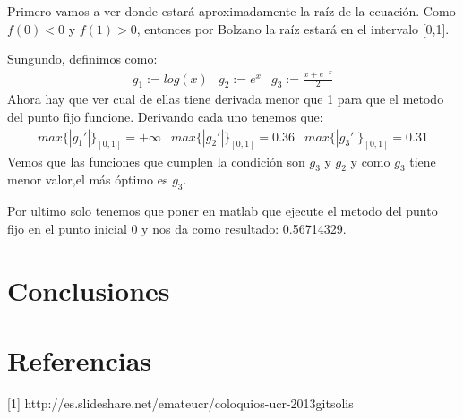 \documentclass[a4paper]{article}
\begin{document}
Primero vamos a ver donde estará aproximadamente la raíz de la ecuación. Como $f(0)<0$ y $f(1)>0$, entonces por Bolzano la raíz estará en el intervalo [0,1].

Sungundo, definimos como:
\begin{equation}
\begin{array}{ccc}
g_{1}:=log(x) & g_{2}:=e^{x} & g_{3}:=\frac{x+e^{-x}}{2}
\end{array}
\end{equation}
Ahora hay que ver cual de ellas tiene derivada menor que 1 para que el metodo del punto fijo funcione. Derivando cada uno tenemos que:
\begin{equation}
\begin{array}{ccc}
max\{|g_{1}'|\}_{[0,1]}=+\infty & max\{|g_{2}'|\}_{[0,1]}=0.36 & max\{|g_{3}'|\}_{[0,1]}=0.31
\end{array}
\end{equation}
Vemos que las funciones que cumplen la condición son $g_{3}$ y $g_{2}$ y como $g_{3}$ tiene menor valor,el más óptimo es $g_{3}$.

Por ultimo solo tenemos que poner en matlab que ejecute el metodo del punto fijo en el punto inicial 0 y nos da como resultado: 0.56714329.

\section{Conclusiones}
\section{Referencias}
[1] http://es.slideshare.net/emateucr/coloquios-ucr-2013gitsolis
\end{document}
